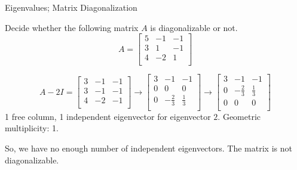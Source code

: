\documentclass{beamer}
\begin{document}
\begin{frame}{Eigenvalues; Matrix Diagonalization}
    \begin{example}
        Decide whether the following matrix $A$ is diagonalizable or not.
        \begin{equation*}
            A=\left[ \begin{matrix}
                5&		-1&		-1\\
                3&		1&		-1\\
                4&		-2&		1\\
            \end{matrix} \right]
        \end{equation*}
    \end{example}
    \begin{equation*}
    A-2I=
    \left[ \begin{matrix}
        3&		-1&		-1\\
        3&		-1&		-1\\
        4&		-2&		-1\\
    \end{matrix} \right] \rightarrow \left[ \begin{matrix}
        3&		-1&		-1\\
        0&		0&		0\\
        0&		-\frac{2}{3}&		\frac{1}{3}\\
    \end{matrix} \right] \rightarrow \left[ \begin{matrix}
        3&		-1&		-1\\
        0&		-\frac{2}{3}&		\frac{1}{3}\\
        0&		0&		0\\
    \end{matrix} \right]
\end{equation*}
1 free column, 1 independent eigenvector for eigenvector $2$. Geometric multiplicity: 1.

\vspace{3pt}
So, we have no enough number of independent eigenvectors. The matrix is not diagonalizable.
\end{frame}
\end{document}
